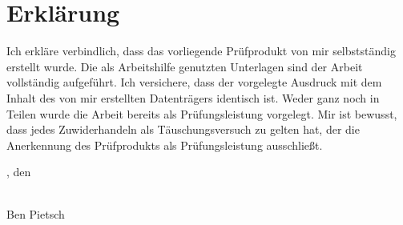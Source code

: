 \chapter{Erklärung}\label{ch:erklaerung}

Ich erkläre verbindlich, dass das vorliegende Prüfprodukt von mir selbstständig erstellt wurde.
Die als Arbeitshilfe genutzten Unterlagen sind der Arbeit vollständig aufgeführt.
Ich versichere, dass der vorgelegte Ausdruck mit dem Inhalt des von mir erstellten Datenträgers identisch ist.
Weder ganz noch in Teilen wurde die Arbeit bereits als Prüfungsleistung vorgelegt.
Mir ist bewusst, dass jedes Zuwiderhandeln als Täuschungsversuch zu gelten hat, der die Anerkennung des Prüfprodukts als Prüfungsleistung ausschließt.
\bigskip
\begingroup
\setlength{\parindent}{0pt} %

\locationDocument, den \dateDocument
\bigskip
\bigskip

\newlength{\widthbox}
\settowidth{\widthbox}{\locationDocument, den \dateDocument}

\makebox[\widthbox]{\hrulefill}\\
Ben Pietsch
\endgroup